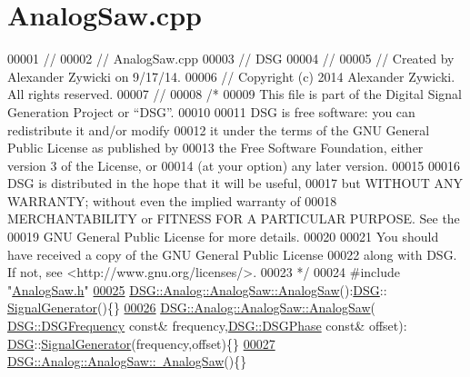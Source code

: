 \hypertarget{_analog_saw_8cpp_source}{\section{Analog\+Saw.\+cpp}
\label{_analog_saw_8cpp_source}
}

\begin{DoxyCode}
00001 \textcolor{comment}{//}
00002 \textcolor{comment}{//  AnalogSaw.cpp}
00003 \textcolor{comment}{//  DSG}
00004 \textcolor{comment}{//}
00005 \textcolor{comment}{//  Created by Alexander Zywicki on 9/17/14.}
00006 \textcolor{comment}{//  Copyright (c) 2014 Alexander Zywicki. All rights reserved.}
00007 \textcolor{comment}{//}
00008 \textcolor{comment}{/*}
00009 \textcolor{comment}{ This file is part of the Digital Signal Generation Project or “DSG”.}
00010 \textcolor{comment}{}
00011 \textcolor{comment}{ DSG is free software: you can redistribute it and/or modify}
00012 \textcolor{comment}{ it under the terms of the GNU General Public License as published by}
00013 \textcolor{comment}{ the Free Software Foundation, either version 3 of the License, or}
00014 \textcolor{comment}{ (at your option) any later version.}
00015 \textcolor{comment}{}
00016 \textcolor{comment}{ DSG is distributed in the hope that it will be useful,}
00017 \textcolor{comment}{ but WITHOUT ANY WARRANTY; without even the implied warranty of}
00018 \textcolor{comment}{ MERCHANTABILITY or FITNESS FOR A PARTICULAR PURPOSE.  See the}
00019 \textcolor{comment}{ GNU General Public License for more details.}
00020 \textcolor{comment}{}
00021 \textcolor{comment}{ You should have received a copy of the GNU General Public License}
00022 \textcolor{comment}{ along with DSG.  If not, see <http://www.gnu.org/licenses/>.}
00023 \textcolor{comment}{ */}
00024 \textcolor{preprocessor}{#include "\hyperlink{_analog_saw_8h}{AnalogSaw.h}"}
\hypertarget{_analog_saw_8cpp_source_l00025}{}\hyperlink{class_d_s_g_1_1_analog_1_1_analog_saw_abcb0b997be32413da0d14b93aeeb9c17}{00025} \hyperlink{class_d_s_g_1_1_analog_1_1_analog_saw_abcb0b997be32413da0d14b93aeeb9c17}{DSG::Analog::AnalogSaw::AnalogSaw}():\hyperlink{namespace_d_s_g}{DSG}::
      \hyperlink{class_d_s_g_1_1_signal_generator}{SignalGenerator}()\{\}
\hypertarget{_analog_saw_8cpp_source_l00026}{}\hyperlink{class_d_s_g_1_1_analog_1_1_analog_saw_ad110da0b337948fb70ecdfad7dbb5ddf}{00026} \hyperlink{class_d_s_g_1_1_analog_1_1_analog_saw_abcb0b997be32413da0d14b93aeeb9c17}{DSG::Analog::AnalogSaw::AnalogSaw}(
      \hyperlink{namespace_d_s_g_a4315a061386fa1014fda09b15d3a6973}{DSG::DSGFrequency} \textcolor{keyword}{const}& frequency,\hyperlink{namespace_d_s_g_a44431ce1eb0a7300efdd207bc879e52c}{DSG::DSGPhase} \textcolor{keyword}{const}& offset):
      \hyperlink{namespace_d_s_g}{DSG}::\hyperlink{class_d_s_g_1_1_signal_generator}{SignalGenerator}(frequency,offset)\{\}
\hypertarget{_analog_saw_8cpp_source_l00027}{}\hyperlink{class_d_s_g_1_1_analog_1_1_analog_saw_a42a5fe22e0c3b9d1bd3996fe5bbd24ba}{00027} \hyperlink{class_d_s_g_1_1_analog_1_1_analog_saw_a42a5fe22e0c3b9d1bd3996fe5bbd24ba}{DSG::Analog::AnalogSaw::~AnalogSaw}()\{\}
\end{DoxyCode}
